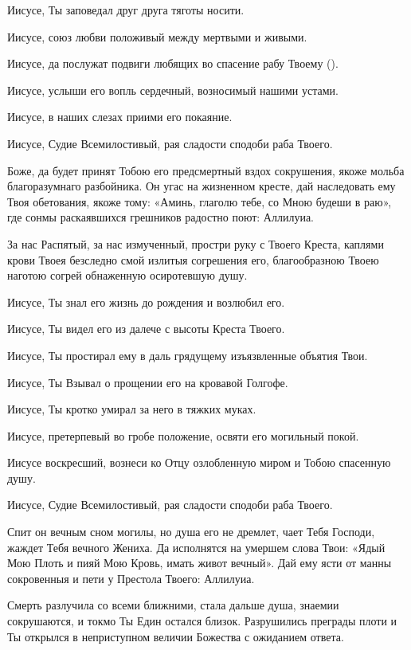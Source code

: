 \begin{mymulticols}
Иисусе, Ты заповедал друг друга тяготы носити. 

Иисусе, союз любви положивый между мертвыми и живыми. 

Иисусе, да послужат подвиги любящих во спасение рабу Твоему (). 

Иисусе, услыши его вопль сердечный, возносимый нашими устами. 

Иисусе, в наших слезах приими его покаяние. 

Иисусе, Судие Всемилостивый, рая сладости сподоби раба Твоего.




Боже, да будет принят Тобою его предсмертный вздох сокрушения, якоже мольба благоразумнаго разбойника. Он угас на жизненном кресте, дай наследовать ему Твоя обетования, якоже тому: «Аминь, глаголю тебе, со Мною будеши в раю», где сонмы раскаявшихся грешников радостно поют: Аллилуиа.




За нас Распятый, за нас измученный, простри руку с Твоего Креста, каплями крови Твоея безследно смой излитыя согрешения его, благообразною Твоею наготою согрей обнаженную осиротевшую душу. 

Иисусе, Ты знал его жизнь до рождения и возлюбил его. 

Иисусе, Ты видел его из далече с высоты Креста Твоего. 

Иисусе, Ты простирал ему в даль грядущему изъязвленные объятия Твои. 

Иисусе, Ты Взывал о прощении его на кровавой Голгофе. 

Иисусе, Ты кротко умирал за него в тяжких муках. 

Иисусе, претерпевый во гробе положение, освяти его могильный покой. 

Иисусе воскресший, вознеси ко Отцу озлобленную миром и Тобою спасенную душу. 

Иисусе, Судие Всемилостивый, рая сладости сподоби раба Твоего.




Спит он вечным сном могилы, но душа его не дремлет, чает Тебя Господи, жаждет Тебя вечного Жениха. Да исполнятся на умершем слова Твои: «Ядый Мою Плоть и пияй Мою Кровь, имать живот вечный». Дай ему ясти от манны сокровенныя и пети у Престола Твоего: Аллилуиа.




Смерть разлучила со всеми ближними, стала дальше душа, знаемии сокрушаются, и токмо Ты Един остался близок. Разрушились преграды плоти и Ты открылся в неприступном величии Божества с ожиданием ответа. 


\end{mymulticols}
